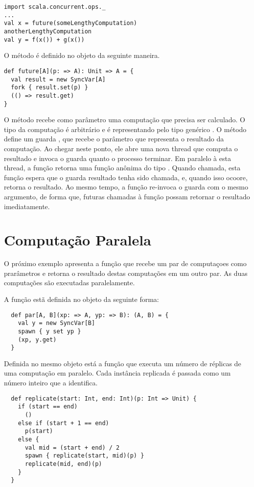 \begin{lstlisting}
import scala.concurrent.ops._
...
val x = future(someLengthyComputation)
anotherLengthyComputation
val y = f(x()) + g(x())
\end{lstlisting}

O método  é definido no objeto
 da seguinte maneira.
\begin{lstlisting}
def future[A](p: => A): Unit => A = {
  val result = new SyncVar[A]
  fork { result.set(p) }
  (() => result.get)
}
\end{lstlisting}

O método  recebe como parâmetro uma computação  que precisa ser 
calculado. O tipo da computação é arbitrário e é representando pelo tipo genérico . 
O método  define um guarda , que recebe o parâmetro que representa
o resultado da computação.  
Ao chegar neste ponto, ele abre uma nova thread que computa o resultado e invoca o guarda  
quanto o processo terminar. Em paralelo à esta thread, a função retorna uma função anônima do
tipo . Quando chamada, esta função espera que o guarda resultado tenha sido chamada, e, quando isso
ocoore, retorna o resultado.
Ao mesmo tempo, a função re-invoca o guarda  com o mesmo argumento, de forma que, futuras chamadas
à função possam retornar o resultado imediatamente.

\section{Computação Paralela}

O próximo exemplo apresenta a função  que recebe um par de computaçoes como prarâmetros
e retorna o resultado destas computações em um outro par. As duas computações são executadas
paralelamente.

A função estã definida no objeto
 da seguinte forma:
\begin{lstlisting}
  def par[A, B](xp: => A, yp: => B): (A, B) = {
    val y = new SyncVar[B]
    spawn { y set yp }
    (xp, y.get)
  }
\end{lstlisting}
Definida no mesmo objeto está a função  que executa um número de réplicas
de uma computação em paralelo. Cada instância replicada é passada como um número inteiro
que a identifica.
\begin{lstlisting}
  def replicate(start: Int, end: Int)(p: Int => Unit) {
    if (start == end)
      ()
    else if (start + 1 == end)
      p(start)
    else {
      val mid = (start + end) / 2
      spawn { replicate(start, mid)(p) }
      replicate(mid, end)(p)
    }
  }
\end{lstlisting}

